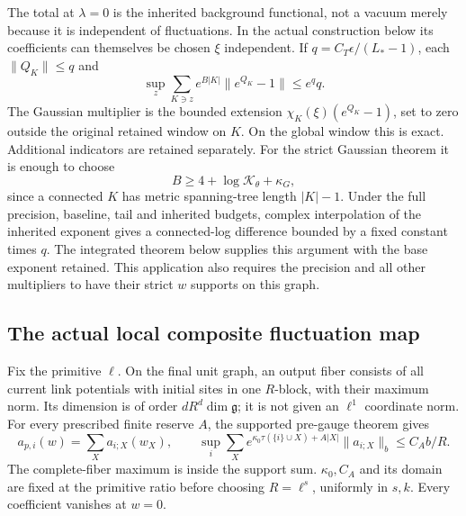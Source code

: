 \documentclass[11pt]{article}
\theoremstyle{remark}
\begin{document}
The total at $\lambda=0$ is the inherited background
functional, not a vacuum merely because it is independent
of fluctuations. In the actual construction below its
coefficients can themselves be chosen $\xi$ independent.
If
$q=C_T\epsilon/(L_*-1)$, each $\|Q_K\|\le q$ and
\begin{equation}\label{cdj-multiplier}
 \sup_z\sum_{K\ni z}e^{B|K|}
                     \|e^{Q_K}-1\|\le e^q q.
\end{equation}
The Gaussian multiplier is the bounded extension
$\chi_K(\xi)(e^{Q_K}-1)$, set to zero outside the original
retained window on $K$. On the global window this is
exact. Additional indicators are retained separately.
For the strict Gaussian theorem it is enough to choose
\begin{equation}\label{cdj-Gaussian-weight}
 B\ge4+\log\mathcal K_\theta+\kappa_G,
\end{equation}
since a connected $K$ has metric spanning-tree length
$|K|-1$. Under the full precision, baseline, tail and inherited
budgets, complex interpolation of the inherited exponent gives
a connected-log difference bounded by a fixed constant times $q$.
The integrated theorem below supplies this argument with the
base exponent retained. This application also requires the
precision and all other multipliers to have their strict $w$
supports on this graph.

\subsection{The actual local composite fluctuation map}
\label{cdj-local-map-section}

Fix the primitive $\ell$. On the final unit graph, an output
fiber consists of all current link potentials with initial
sites in one $R$-block, with their maximum norm. Its dimension
is of order $dR^d\dim\mathfrak g$; it is not given an
$\ell^1$ coordinate norm. For every prescribed finite reserve
$A$, the supported pre-gauge theorem gives
\begin{equation}\label{cdj-ap-family}
 a_{p,i}(w)=\sum_Xa_{i;X}(w_X),\qquad
 \sup_i\sum_Xe^{\kappa_0\tau(\{i\}\cup X)+A|X|}
                       \|a_{i;X}\|_b\le C_A b/R.
\end{equation}
The complete-fiber maximum is inside the support sum.
$\kappa_0,C_A$ and its domain are fixed at the primitive
ratio before choosing $R=\ell^s$, uniformly in $s,k$.
Every coefficient vanishes at $w=0$.
\end{document}

